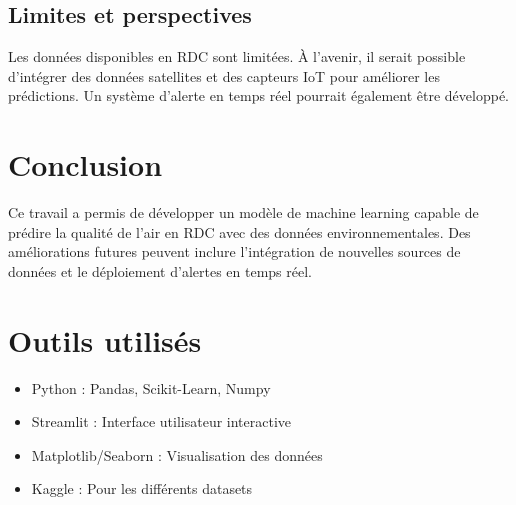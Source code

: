 \documentclass[12pt]{article}
\begin{document}
\subsection{Limites et perspectives}
Les données disponibles en RDC sont limitées. À l'avenir, il serait possible d'intégrer des données satellites et des capteurs IoT pour améliorer les prédictions. Un système d'alerte en temps réel pourrait également être développé.

\section{Conclusion}
Ce travail a permis de développer un modèle de machine learning capable de prédire la qualité de l'air en RDC avec des données environnementales. Des améliorations futures peuvent inclure l'intégration de nouvelles sources de données et le déploiement d'alertes en temps réel.

\section{Outils utilisés}
\begin{itemize}
    \item Python : Pandas, Scikit-Learn, Numpy
    \item Streamlit : Interface utilisateur interactive
    \item Matplotlib/Seaborn : Visualisation des données
    \item Kaggle : Pour les différents datasets
\end{itemize}
\end{document}
